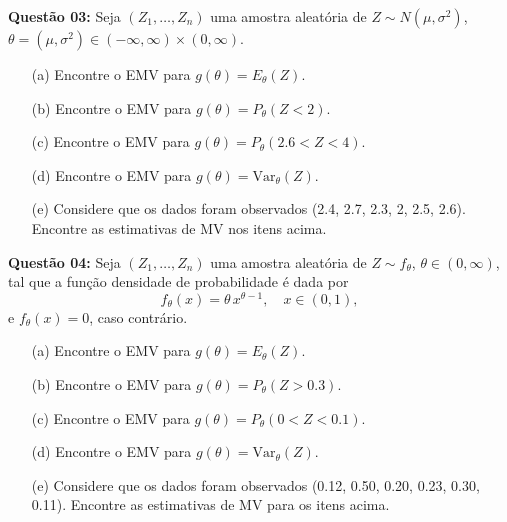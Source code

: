 \documentclass[a4paper]{article}
\begin{document}
\textbf{Questão 03:}  
Seja $(Z_1, \ldots, Z_n)$ uma amostra aleatória de $Z \sim N(\mu, \sigma^2)$, $\theta = (\mu, \sigma^2) \in (-\infty,\infty) \times (0,\infty)$.
\begin{itemize}
  \item[(a)] Encontre o EMV para $g(\theta) = E_\theta(Z)$.
  \item[(b)] Encontre o EMV para $g(\theta) = P_\theta(Z < 2)$.
  \item[(c)] Encontre o EMV para $g(\theta) = P_\theta(2.6 < Z < 4)$.
  \item[(d)] Encontre o EMV para $g(\theta) = \mathrm{Var}_\theta(Z)$.
  \item[(e)] Considere que os dados foram observados (2.4, 2.7, 2.3, 2, 2.5, 2.6). Encontre as estimativas de MV nos itens acima.
\end{itemize}

    \begin{answer}[]

    \end{answer}

\textbf{Questão 04:}  
Seja $(Z_1, \ldots, Z_n)$ uma amostra aleatória de $Z \sim f_\theta$, $\theta \in (0,\infty)$, tal que a função densidade de probabilidade é dada por  
\[
f_\theta(x) = \theta \, x^{\theta-1}, \quad x \in (0,1),
\]
e $f_\theta(x) = 0$, caso contrário.
\begin{itemize}
  \item[(a)] Encontre o EMV para $g(\theta) = E_\theta(Z)$.
  \item[(b)] Encontre o EMV para $g(\theta) = P_\theta(Z > 0.3)$.
  \item[(c)] Encontre o EMV para $g(\theta) = P_\theta(0 < Z < 0.1)$.
  \item[(d)] Encontre o EMV para $g(\theta) = \mathrm{Var}_\theta(Z)$.
  \item[(e)] Considere que os dados foram observados (0.12, 0.50, 0.20, 0.23, 0.30, 0.11). Encontre as estimativas de MV para os itens acima.
\end{itemize}

    \begin{answer}[]

    \end{answer}
\end{document}
